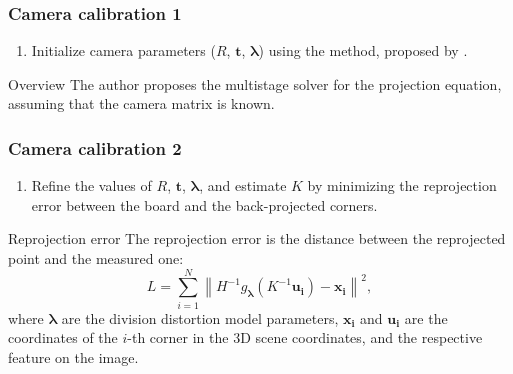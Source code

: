 \documentclass{beamer}
\begin{document}
\begin{frame}
\begin{figure}[h]
		\label{fig:corner_prototypes}
	\end{figure}

\end{frame}

\begin{frame}
	\frametitle{Camera calibration 1}

	\begin{enumerate}
		\item Initialize camera parameters (\(R\), \(\mathbf{t}\),
		      \(\boldsymbol{\lambda}\)) using the method, proposed by
		      \cite{scaramuzzaToolboxEasilyCalibrating2006}.
	\end{enumerate}
	\begin{exampleblock}{Overview}
		The author proposes the multistage solver for the projection equation,
		assuming that the camera matrix is known.
	\end{exampleblock}
\end{frame}

\begin{frame}
	\frametitle{Camera calibration 2}
	\begin{enumerate}
		\item Refine the values of \(R\), \(\mathbf{t}\), \(\boldsymbol{\lambda}\), and
		      estimate \(K\) by minimizing the reprojection error between the
		      board and the back-projected corners.
	\end{enumerate}

	\begin{exampleblock}{Reprojection error}
		The reprojection error is the distance between the reprojected point and the
		measured one:
		\begin{equation*}
			L = \sum_{i=1}^{N} \left\lVert
			H^{-1} g_{ \boldsymbol{\lambda}}(K^{-1} \mathbf{u_i}) -
			\mathbf{x_i} \right\rVert^2,
		\end{equation*}
		where \(\boldsymbol{\lambda}\) are the division distortion model
		parameters, \( \mathbf{x_{i}}\) and \(\mathbf{u_{i}}\) are the coordinates
		of the \(i\)-th corner in the 3D scene coordinates, and the respective
		feature on the image.
	\end{exampleblock}
\end{frame}
\end{document}
